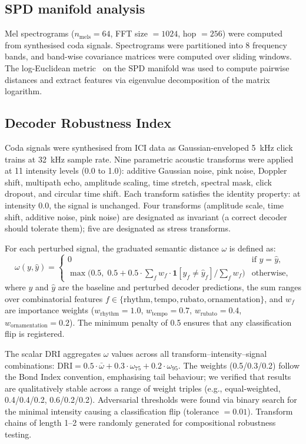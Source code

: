\documentclass[11pt,a4paper]{article}
\begin{document}
\subsection{SPD manifold analysis}
Mel spectrograms ($n_\mathrm{mels} = 64$, FFT size $= 1024$,
hop $= 256$) were computed from synthesised coda signals. Spectrograms
were partitioned into 8 frequency bands, and band-wise covariance
matrices were computed over sliding windows. The log-Euclidean
metric~\citep{Arsigny2007} on the SPD manifold was used to compute
pairwise distances and extract features via eigenvalue decomposition of
the matrix logarithm.

\subsection{Decoder Robustness Index}
Coda signals were synthesised from ICI data as Gaussian-enveloped
5~kHz click trains at 32~kHz sample rate. Nine parametric acoustic
transforms were applied at 11 intensity levels (0.0 to 1.0): additive
Gaussian noise, pink noise, Doppler shift, multipath echo, amplitude
scaling, time stretch, spectral mask, click dropout, and circular time
shift. Each transform satisfies the identity property: at intensity 0.0,
the signal is unchanged. Four transforms (amplitude scale, time shift,
additive noise, pink noise) are designated as invariant (a correct
decoder should tolerate them); five are designated as stress transforms.

For each perturbed signal, the graduated semantic distance $\omega$ is
defined as:
\[
\omega(y, \hat{y}) =
\begin{cases}
0 & \text{if } y = \hat{y}, \\
\max\!\bigl(0.5,\; 0.5 + 0.5 \cdot \sum_{f} w_f \cdot
\mathbf{1}[y_f \neq \hat{y}_f] \big/ \sum_{f} w_f\bigr) &
\text{otherwise},
\end{cases}
\]
where $y$ and $\hat{y}$ are the baseline and perturbed decoder
predictions, the sum ranges over combinatorial features
$f \in \{\text{rhythm}, \text{tempo}, \text{rubato},
\text{ornamentation}\}$, and $w_f$ are importance weights ($w_\text{rhythm}
= 1.0$, $w_\text{tempo} = 0.7$, $w_\text{rubato} = 0.4$,
$w_\text{ornamentation} = 0.2$). The minimum penalty of 0.5 ensures
that any classification flip is registered.

The scalar DRI aggregates $\omega$ values across all
transform--intensity--signal combinations:
$\text{DRI} = 0.5 \cdot \bar{\omega} + 0.3 \cdot \omega_{75} + 0.2
\cdot \omega_{95}$. The weights (0.5/0.3/0.2) follow the Bond Index
convention, emphasising tail behaviour; we verified that results are
qualitatively stable across a range of weight triples (e.g.,
equal-weighted, 0.4/0.4/0.2, 0.6/0.2/0.2). Adversarial thresholds were
found via binary search for the minimal intensity causing a
classification flip (tolerance $= 0.01$).
Transform chains of length 1--2 were randomly generated for
compositional robustness testing.
\end{document}
